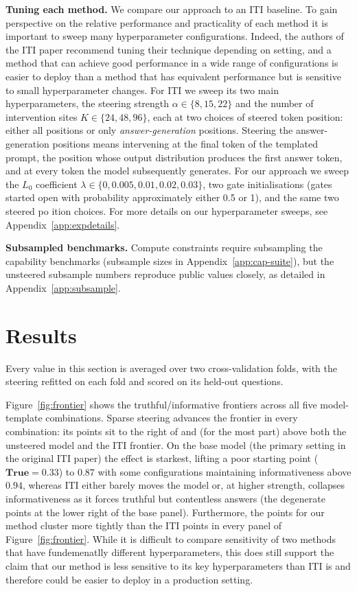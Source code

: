 \documentclass[logo,msc,notimes]{infthesis}
\begin{document}
\textbf{Tuning each method.} We compare our approach to an ITI baseline. To gain perspective on the relative performance and practicality of each method it is important to sweep many hyperparameter configurations. Indeed, the authors of the ITI paper recommend tuning their technique depending on setting, and a method that can achieve good performance in a wide range of configurations is easier to deploy than a method that has equivalent performance but is sensitive to small hyperparameter changes. For ITI we sweep its two main hyperparameters, the steering strength $\alpha \in \{8, 15, 22\}$ and the number of intervention sites $K \in \{24, 48, 96\}$, each at two choices of steered token position: either all positions or only \emph{answer-generation} positions. Steering the answer-generation positions means intervening at the final token of the templated prompt, the position whose output distribution produces the first answer token, and at every token the model subsequently generates. For our approach we sweep the $L_0$ coefficient $\lambda \in \{0, 0.005, 0.01, 0.02, 0.03\}$, two gate initialisations (gates started open with probability approximately either 0.5 or 1), and the same two steered po ition choices. For more details on our hyperparameter sweeps, see Appendix~\ref{app:expdetails}. 

\textbf{Subsampled benchmarks.} Compute constraints require subsampling the capability benchmarks (subsample sizes in Appendix~\ref{app:cap-suite}), but the unsteered subsample
numbers reproduce public values closely, as detailed in Appendix~\ref{app:subsample}.

\section{Results}\label{sec:tqa-results}


 Every value in this section is averaged over two cross-validation folds, with the steering refitted on each fold and scored on its held-out questions.

Figure~\ref{fig:frontier} shows the truthful/informative frontiers across all five model-template combinations. Sparse steering advances the frontier in every combination: its points sit to the right of and (for the most part) above both the
unsteered model and the ITI frontier. On the base model (the primary setting in the original ITI paper) the effect is starkest, lifting a poor starting point ($\textbf{True}=0.33$) to $0.87$ with some configurations maintaining informativeness above $0.94$, whereas ITI either barely moves the model or, at higher strength, collapses informativeness as it forces truthful but contentless answers (the degenerate points at the lower right of the base panel). Furthermore, the points for our method cluster more tightly than the ITI points in every panel of Figure~\ref{fig:frontier}. While it is difficult to compare sensitivity of two methods that have fundemenatlly different hyperparameters, this does still support the claim that our method is less sensitive to its key hyperparameters than ITI is and therefore could be easier to deploy in a production setting. 
\end{document}
